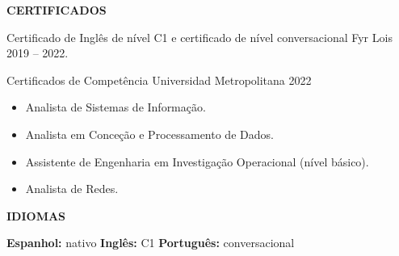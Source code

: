 \documentclass[10pt,a4paper]{article}
\newcommand{\cvsection}[1]{%
    \vspace{11pt}%
    {\large\bfseries\color{navy}#1}\par
    \vspace{2pt}{\color{accent}\rule{\linewidth}{1.2pt}}\par
    \vspace{5pt}%
}
\begin{document}
\cvsection{CERTIFICADOS}
Certificado de Inglês de nível C1 e certificado de nível conversacional \textbar{} Fyr Lois \textbar{} 2019 -- 2022.

\vspace{4pt}
Certificados de Competência \textbar{} Universidad Metropolitana \textbar{} 2022
\begin{itemize}
    \item Analista de Sistemas de Informação.
    \item Analista em Conceção e Processamento de Dados.
    \item Assistente de Engenharia em Investigação Operacional (nível básico).
    \item Analista de Redes.
\end{itemize}

\cvsection{IDIOMAS}
\textbf{Espanhol:} nativo \hfill
\textbf{Inglês:} C1 \hfill
\textbf{Português:} conversacional
\end{document}
